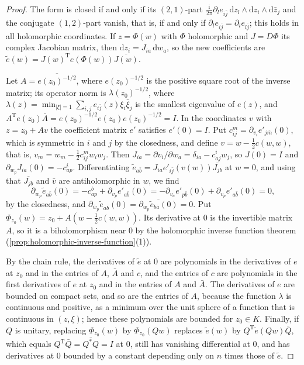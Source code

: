 \begin{proof}
The form is closed if and only if its $(2,1)$-part $\frac{\mathrm i}{2\pi}\partial_le_{i\bar j}\,\mathrm dz_l\wedge\mathrm dz_i\wedge\mathrm d\bar z_j$ and the conjugate $(1,2)$-part vanish, that is, if and only if $\partial_le_{i\bar j}=\partial_ie_{l\bar j}$; this holds in all holomorphic coordinates. If $z=\Phi(w)$ with $\Phi$ holomorphic and $J=D\Phi$ its complex Jacobian matrix, then $\mathrm dz_i=J_{ia}\,\mathrm dw_a$, so the new coefficients are $\tilde e(w)=J(w)^{\mathrm T}e(\Phi(w))\overline{J(w)}$.

Let $A=\overline{e(z_0)^{-1/2}}$, where $e(z_0)^{-1/2}$ is the positive square root of the inverse matrix; its operator norm is $\lambda(z_0)^{-1/2}$, where $\lambda(z)=\min_{|\xi|=1}\sum_{i,j}e_{i\bar j}(z)\xi_i\bar\xi_j$ is the smallest eigenvalue of $e(z)$, and $A^{\mathrm T}e(z_0)\bar A=e(z_0)^{-1/2}e(z_0)e(z_0)^{-1/2}=I$. In the coordinates $v$ with $z=z_0+Av$ the coefficient matrix $e'$ satisfies $e'(0)=I$. Put $c^m_{ij}=\partial_{v_i}e'_{j\bar m}(0)$, which is symmetric in $i$ and $j$ by the closedness, and define $v=w-\frac12c(w,w)$, that is, $v_m=w_m-\frac12c^m_{ij}w_iw_j$. Then $J_{ia}=\partial v_i/\partial w_a=\delta_{ia}-c^i_{aj}w_j$, so $J(0)=I$ and $\partial_{w_p}J_{ia}(0)=-c^i_{ap}$. Differentiating $\tilde e_{a\bar b}=J_{ia}e'_{i\bar j}(v(w))\overline{J_{jb}}$ at $w=0$, and using that $\overline{J_{jb}}$ and $\bar v$ are antiholomorphic in $w$, we find
\[
 \partial_{w_p}\tilde e_{a\bar b}(0)=-c^b_{ap}+\partial_{v_p}e'_{a\bar b}(0)=-\partial_{v_a}e'_{p\bar b}(0)+\partial_{v_p}e'_{a\bar b}(0)=0,
\]
by the closedness, and $\partial_{\bar w_p}\tilde e_{a\bar b}(0)=\overline{\partial_{w_p}\tilde e_{b\bar a}(0)}=0$. Put $\Phi_{z_0}(w)=z_0+A(w-\frac12c(w,w))$. Its derivative at $0$ is the invertible matrix $A$, so it is a biholomorphism near $0$ by the holomorphic inverse function theorem (\cref{prop:holomorphic-inverse-function}(1)).

By the chain rule, the derivatives of $\tilde e$ at $0$ are polynomials in the derivatives of $e$ at $z_0$ and in the entries of $A$, $\bar A$ and $c$, and the entries of $c$ are polynomials in the first derivatives of $e$ at $z_0$ and in the entries of $A$ and $\bar A$. The derivatives of $e$ are bounded on compact sets, and so are the entries of $A$, because the function $\lambda$ is continuous and positive, as a minimum over the unit sphere of a function that is continuous in $(z,\xi)$; hence these polynomials are bounded for $z_0\in K$. Finally, if $Q$ is unitary, replacing $\Phi_{z_0}(w)$ by $\Phi_{z_0}(Qw)$ replaces $\tilde e(w)$ by $Q^{\mathrm T}\tilde e(Qw)\bar Q$, which equals $Q^{\mathrm T}\bar Q=\overline{Q^*Q}=I$ at $0$, still has vanishing differential at $0$, and has derivatives at $0$ bounded by a constant depending only on $n$ times those of $\tilde e$.
\end{proof}

